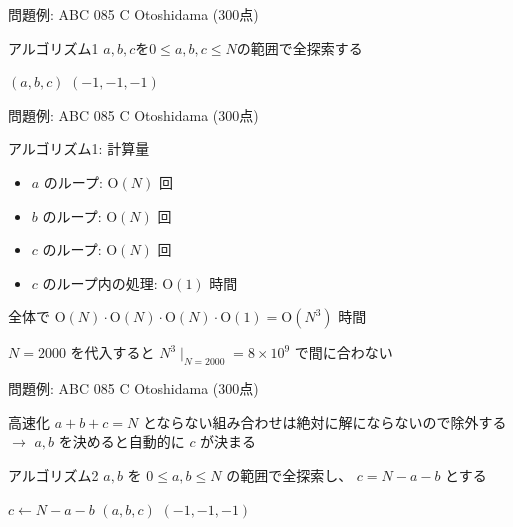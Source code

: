 \documentclass[dvipdfmx]{beamer}
\begin{document}
\begin{frame}{問題例: ABC 085 C Otoshidama (300点)}
  \begin{block}{アルゴリズム1}
    $a,b,c$を$0 \le a,b,c \le N$の範囲で全探索する
    \begin{algorithmic}
      \RETURN $(a, b, c)$
      \ENDIF
      \ENDFOR
      \ENDFOR
      \ENDFOR
      \RETURN $(-1, -1, -1)$
    \end{algorithmic}
  \end{block}
\end{frame}

\begin{frame}{問題例: ABC 085 C Otoshidama (300点)}
  \begin{block}{アルゴリズム1: 計算量}
    \begin{itemize}
      \item $a$ のループ: $\mathrm{O}(N)$ 回
      \item $b$ のループ: $\mathrm{O}(N)$ 回
      \item $c$ のループ: $\mathrm{O}(N)$ 回
      \item $c$ のループ内の処理: $\mathrm{O}(1)$ 時間
    \end{itemize}
    全体で $\mathrm{O}(N) \cdot \mathrm{O}(N) \cdot \mathrm{O}(N) \cdot \mathrm{O}(1) = \mathrm{O}(N^3)$ 時間

    $N=2000$ を代入すると $N^3 \mid_{N=2000} = 8 \times 10^9$ で間に合わない
  \end{block}
\end{frame}

\begin{frame}{問題例: ABC 085 C Otoshidama (300点)}
  \begin{block}{高速化}
    $a + b + c = N$ とならない組み合わせは絶対に解にならないので除外する
    $\to$ $a, b$ を決めると自動的に $c$ が決まる
  \end{block}
  \begin{block}{アルゴリズム2}
    $a,b$ を $0 \le a,b \le N$ の範囲で全探索し、 $c = N - a - b$ とする
    \begin{algorithmic}
      \STATE $c \leftarrow N - a - b$
      \RETURN $(a, b, c)$
      \ENDIF
      \ENDFOR
      \ENDFOR
      \RETURN $(-1, -1, -1)$
    \end{algorithmic}
  \end{block}
\end{frame}
\end{document}
